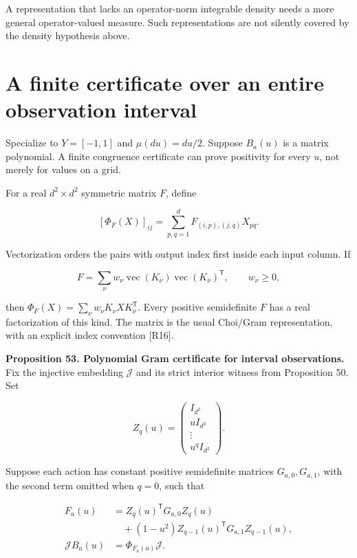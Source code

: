 A representation that lacks an operator-norm integrable density needs a
more general operator-valued measure. Such representations are not
silently covered by the density hypothesis above.

\section{A finite certificate over an entire observation interval}\label{LSM:a-finite-certificate-over-an-entire-observation-interval}

Specialize to \(Y=[-1,1]\) and \(\mu(du)=du/2\). Suppose \(B_a(u)\) is a
matrix polynomial. A finite congruence certificate can prove positivity
for every \(u\), not merely for values on a grid.

For a real \(d^2\times d^2\) symmetric matrix \(F\), define

\[
[\Phi_F(X)]_{ij}=\sum_{p,q=1}^d F_{(i,p),(j,q)}X_{pq}.
\]

Vectorization orders the pairs with output index first inside each input
column. If

\[
F=\sum_\nu w_\nu\operatorname{vec}(K_\nu)
\operatorname{vec}(K_\nu)^{\mathsf T},\qquad w_\nu\geq0,
\]

then \(\Phi_F(X)=\sum_\nu w_\nu K_\nu X K_\nu^{\mathsf T}\). Every
positive semidefinite \(F\) has a real factorization of this kind. The
matrix is the usual Choi/Gram representation, with an explicit index
convention {[}R16{]}.

\textbf{Proposition 53. Polynomial Gram certificate for interval
observations.} Fix the injective embedding \(\mathcal J\) and its strict
interior witness from Proposition 50. Set

\[
Z_q(u)=\begin{pmatrix}I_{d^2}\\uI_{d^2}\\\vdots\\u^qI_{d^2}\end{pmatrix}.
\]

Suppose each action has constant positive semidefinite matrices
\(G_{a,0},G_{a,1}\), with the second term omitted when \(q=0\), such
that

\[
\begin{aligned}
F_a(u)&=Z_q(u)^{\mathsf T}G_{a,0}Z_q(u)\\
&\quad +(1-u^2)Z_{q-1}(u)^{\mathsf T}G_{a,1}Z_{q-1}(u),\\
\mathcal J B_a(u)&=\Phi_{F_a(u)}\mathcal J.
\end{aligned}
\]

